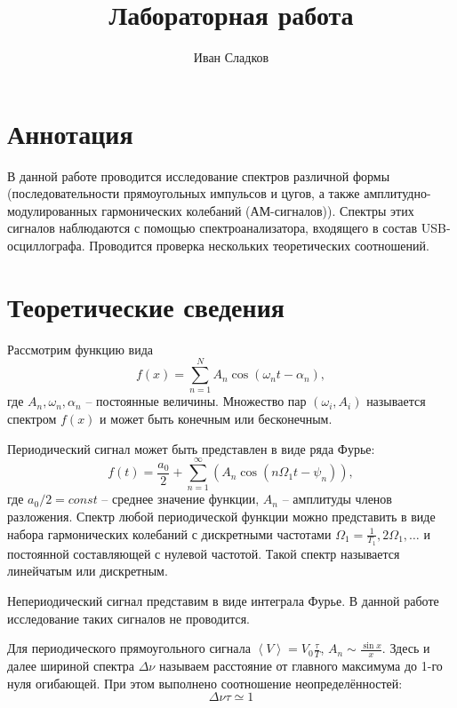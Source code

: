 \documentclass[a4paper]{article}
\title{Лабораторная работа \labnum \space \labname} %
\author{Иван Сладков}
\begin{document}
\maketitle
\thispagestyle{empty}
\section{Аннотация}
В данной работе проводится исследование спектров различной формы (последовательности прямоугольных импульсов и цугов, а также амплитудно-модулированных гармонических колебаний (АМ-сигналов)). Спектры этих сигналов наблюдаются с помощью спектроанализатора, входящего в состав USB-осциллографа. Проводится проверка нескольких теоретических соотношений.

\section{Теоретические сведения}

Рассмотрим функцию вида 
\begin{equation}\label{f}
	f(x) = \sum_{n=1}^{N}A_n \cos(\omega_n t -\alpha_n),
\end{equation}
где $ A_n, \omega_n, \alpha_n $ -- постоянные величины. Множество пар $ (\omega_i, A_i) $ называется спектром $ f(x) $ и может быть конечным или бесконечным.

Периодический сигнал может быть представлен в виде ряда Фурье:
\begin{equation}\label{key}
	f(t) = \frac{a_0}{2}+\sum_{n=1}^{\infty}(A_n \cos(n \Omega_1 t - \psi_n)),
\end{equation}
где $ a_0/2 = const $ -- среднее значение функции, $ A_n $ -- амплитуды членов разложения. Спектр любой периодической функции можно представить в виде набора гармонических колебаний с дискретными частотами $ \Omega_1 = \frac{1}{T_1}, 2\Omega_1, \ldots $ и постоянной составляющей с нулевой частотой. Такой спектр называется линейчатым или дискретным.

Непериодический сигнал представим в виде интеграла Фурье. В данной работе исследование таких сигналов не проводится.

Для периодического прямоугольного сигнала $ \left< V \right> = V_0 \frac{\tau}{T} $, $ A_n \sim \frac{\sin x}{x} $. Здесь и далее шириной спектра $ \Delta \nu $ называем расстояние от главного максимума до 1-го нуля огибающей. При этом выполнено соотношение неопределённостей:
\begin{equation}\label{eq:неопр}
	\Delta \nu \tau \simeq 1
\end{equation}
\end{document}
